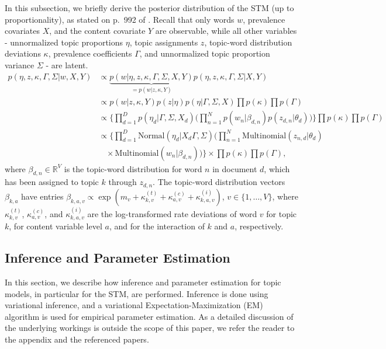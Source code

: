 In this subsection, we briefly derive the posterior distribution of the STM (up to proportionality), as stated on p.\ 992 of \cite{roberts2016model}. Recall that only words $w$, prevalence covariates $X$, and the content covariate $Y$ are observable, while all other variables - unnormalized topic proportions $\eta$, topic assignments $z$, topic-word distribution deviations $\kappa$, prevalence coefficients $\Gamma$, and unnormalized topic proportion variance $\Sigma$ - are latent.
\begin{align*}
p(\eta, z, \kappa, \Gamma, \Sigma | w, X, Y) & \propto \underbrace{p(w | \eta, z, \kappa, \Gamma, \Sigma, X, Y)}_{=p(w | z, \kappa, Y)} p(\eta, z, \kappa, \Gamma, \Sigma | X, Y) \\
& \propto p(w | z, \kappa, Y) p(z | \eta) p(\eta | \Gamma, \Sigma, X) \prod p(\kappa) \prod p(\Gamma)\\
& \propto \Big\{ \prod_{d=1}^{D} p(\eta_d | \Gamma, \Sigma, X_d) \Big( \prod_{n=1}^{N} p(w_n | \beta_{d, n}) p(z_{d,n} | \theta_d) \Big) \Big\} \prod p(\kappa) \prod p(\Gamma)\\
& \propto \Big\{ \prod_{d=1}^{D} \text{Normal}(\eta_d | X_d \Gamma, \Sigma) \Big( \prod_{n=1}^{N} \text{Multinomial}(z_{n,d}| \theta_d) \\
& \ \ \ \ \times \text{Multinomial}(w_n | \beta_{d,n}) \Big) \Big\} \times \prod p(\kappa) \prod p(\Gamma),
\end{align*}
where $\beta_{d, n} \in \mathbb{R}^V$ is the topic-word distribution for word $n$ in document $d$, which has been assigned to topic $k$ through $z_{d,n}$. The topic-word distribution vectors $\beta_{k,a}$ have entries $\beta_{k,a,v} \propto \exp(m_{v} + \kappa_{k,v}^{(t)} + \kappa_{a,v}^{(c)} + \kappa_{k, a,v}^{(i)})$, $v \in \{1,\dots,V\}$, where $\kappa_{k,v}^{(t)}$, $\kappa_{a,v}^{(c)}$, and $\kappa_{k, a,v}^{(i)}$ are the log-transformed rate deviations of word $v$ for topic $k$, for content variable level $a$, and for the interaction of $k$ and $a$, respectively.

\subsection{Inference and Parameter Estimation}

In this section, we describe how inference and parameter estimation for topic models, in particular for the STM, are performed. Inference is done using variational inference, and a variational Expectation-Maximization (EM) algorithm is used for empirical parameter estimation. As a detailed discussion of the underlying workings is outside the scope of this paper, we refer the reader to the appendix and the referenced papers.

